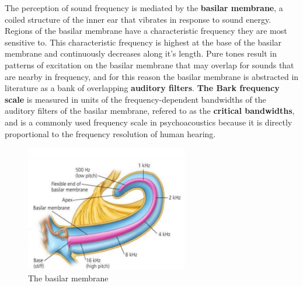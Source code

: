 The perception of sound frequency is mediated by the \textbf{basilar membrane}, a coiled structure of the inner ear that vibrates in response 
to sound energy.
Regions of the basilar membrane have a characteristic frequency they are most sensitive to. This characteristic frequency is highest at the 
base of the basilar membrane and continuously decreases along it's length.
Pure tones result in patterns of excitation on the basilar membrane that may overlap for sounds that are nearby in frequency, and for this reason the 
basilar membrane is abstracted in literature as a bank of overlapping \textbf{auditory filters}.
\textbf{The Bark frequency scale} is measured in units of the frequency-dependent bandwidths of the auditory filters of the basilar membrane, refered 
to as the \textbf{critical bandwidths}, and is a commonly used frequency scale in psychoacoustics because it is directly proportional to the frequency 
resolution of human hearing.


\begin{figure}
  \centerline{\includegraphics[width=2.8in]{figs/bmem}}
  \caption{The basilar membrane}
  \label{fig:basilarmembrane}
\end{figure}

